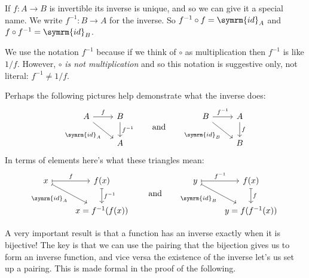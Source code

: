 \documentclass[fleqn]{LectureClass/LectureClass}
\newcommand{\id}{\symrm{id}}
\begin{document}
    \begin{ntn}{}{}
        If \(f \colon A \to B\) is invertible its inverse is unique, and so we can give it a special name.
        We write \(f^{-1} \colon B \to A\) for the inverse.
        So \(f^{-1} \circ f = \id_A\) and \(f \circ f^{-1} = \id_B\).
    \end{ntn}
    
    \begin{wrn}
        We use the notation \(f^{-1}\) because if we think of \(\circ\) as multiplication then \(f^{-1}\) is like \(1/f\).
        However, \(\circ\) \emph{is not multiplication} and so this notation is suggestive only, not literal: \(f^{-1} \ne 1/f\).
    \end{wrn}
    
    Perhaps the following pictures help demonstrate what the inverse does:
    \begin{equation}
        \begin{tikzcd}
            A \arrow[r, "f"] \arrow[dr, "\id_A"'] & B \arrow[d, "f^{-1}"]\\
            & A
        \end{tikzcd}
        \qqand
        \begin{tikzcd}
            B \arrow[r, "f^{-1}"] \arrow[dr, "\id_B"'] & A \arrow[d, "f"]\\
            & B
        \end{tikzcd}
    \end{equation}
    In terms of elements here's what these triangles mean:
    \begin{equation}
        \begin{tikzcd}
            x \arrow[r, mapsto, "f"] \arrow[dr, mapsto, "\id_A"'] & f(x) \arrow[d, mapsto, "f^{-1}"]\\
            & x = f^{-1}(f(x))
        \end{tikzcd}
        \qqand
        \begin{tikzcd}
            y \arrow[r, mapsto, "f^{-1}"] \arrow[dr, mapsto, "\id_B"'] & f(x) \arrow[d, mapsto, "f"]\\
            & y = f(f^{-1}(x))
        \end{tikzcd}
    \end{equation}
    
    A very important result is that a function has an inverse exactly when it is bijective!
    The key is that we can use the pairing that the bijection gives us to form an inverse function, and vice versa the existence of the inverse let's us set up a pairing.
    This is made formal in the proof of the following.
    
\end{document}
